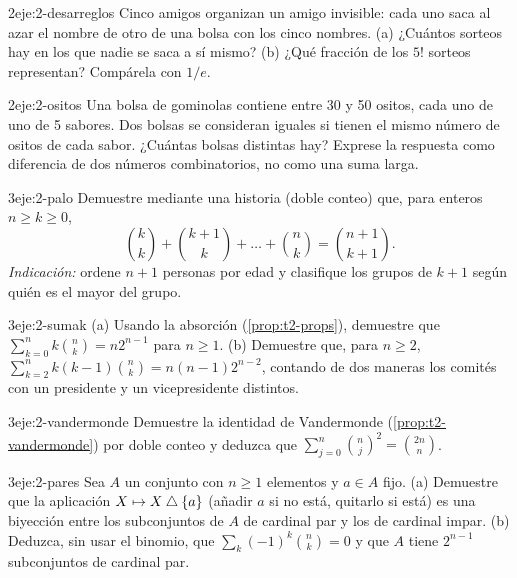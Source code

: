 \begin{ejercicio}{2}{eje:2-desarreglos}
Cinco amigos organizan un amigo invisible: cada uno saca al azar el nombre de otro de una bolsa con los cinco nombres. (a) ¿Cuántos sorteos hay en los que nadie se saca a sí mismo? (b) ¿Qué fracción de los $5!$ sorteos representan? Compárela con $1/e$.
\end{ejercicio}

\begin{ejercicio}{2}{eje:2-ositos}
Una bolsa de gominolas contiene entre 30 y 50 ositos, cada uno de uno de 5 sabores. Dos bolsas se consideran iguales si tienen el mismo número de ositos de cada sabor. ¿Cuántas bolsas distintas hay? Exprese la respuesta como diferencia de dos números combinatorios, no como una suma larga.
\end{ejercicio}

\begin{ejercicio}{3}{eje:2-palo}
Demuestre mediante una historia (doble conteo) que, para enteros $n\ge k\ge0$,
\[
\binom{k}{k}+\binom{k+1}{k}+\dots+\binom{n}{k}=\binom{n+1}{k+1}.
\]
\emph{Indicación:} ordene $n+1$ personas por edad y clasifique los grupos de $k+1$ según quién es el mayor del grupo.
\end{ejercicio}

\begin{ejercicio}{3}{eje:2-sumak}
(a) Usando la absorción (\cref{prop:t2-props}), demuestre que $\sum_{k=0}^{n}k\binom{n}{k}=n2^{n-1}$ para $n\ge1$. (b) Demuestre que, para $n\ge2$, $\sum_{k=2}^{n}k(k-1)\binom{n}{k}=n(n-1)2^{n-2}$, contando de dos maneras los comités con un presidente y un vicepresidente distintos.
\end{ejercicio}

\begin{ejercicio}{3}{eje:2-vandermonde}
Demuestre la identidad de Vandermonde (\cref{prop:t2-vandermonde}) por doble conteo y deduzca que $\sum_{j=0}^{n}\binom{n}{j}^{2}=\binom{2n}{n}$.
\end{ejercicio}

\begin{ejercicio}{3}{eje:2-pares}
Sea $A$ un conjunto con $n\ge1$ elementos y $a\in A$ fijo. (a) Demuestre que la aplicación $X\mapsto X\mathbin{\triangle}\{a\}$ (añadir $a$ si no está, quitarlo si está) es una biyección entre los subconjuntos de $A$ de cardinal par y los de cardinal impar. (b) Deduzca, sin usar el binomio, que $\sum_{k}(-1)^{k}\binom{n}{k}=0$ y que $A$ tiene $2^{n-1}$ subconjuntos de cardinal par.
\end{ejercicio}
